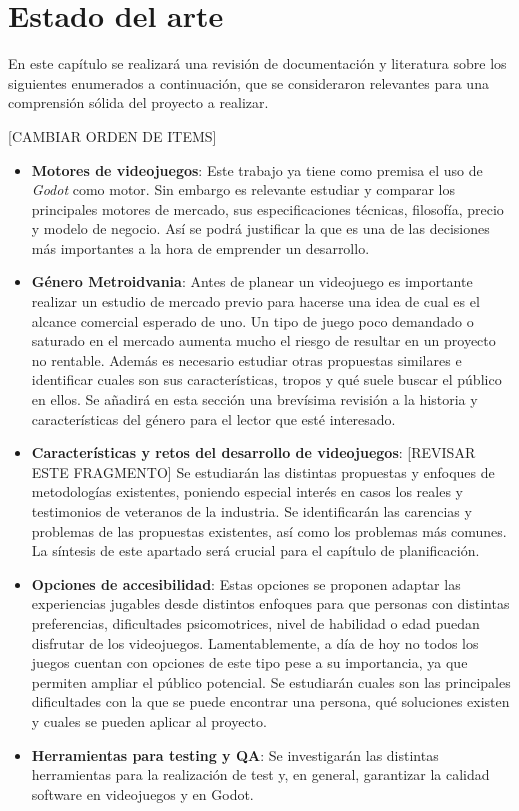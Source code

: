 \chapter{Estado del arte}

En este capítulo se realizará una revisión de documentación y literatura sobre los siguientes enumerados a continuación, que se consideraron relevantes para una comprensión sólida del proyecto a realizar.

[CAMBIAR ORDEN DE ITEMS]
\begin{itemize}
    \item \textbf{Motores de videojuegos}: Este trabajo ya tiene como premisa el uso de \textit{Godot} como motor. Sin embargo es relevante estudiar y comparar los principales motores de mercado, sus especificaciones técnicas, filosofía, precio y modelo de negocio. Así se podrá justificar la que es una de las decisiones más importantes a la hora de emprender un desarrollo.
    
    \item \textbf{Género Metroidvania}: Antes de planear un videojuego es importante realizar un estudio de mercado previo para hacerse una idea de cual es el alcance comercial esperado de uno. Un tipo de juego poco demandado o saturado en el mercado aumenta mucho el riesgo de resultar en un proyecto no rentable. Además es necesario estudiar otras propuestas similares e identificar cuales son sus características, tropos y qué suele buscar el público en ellos. Se añadirá en esta sección una brevísima revisión a la historia y características del género para el lector que esté interesado.
    
    \item \textbf{Características y retos del desarrollo de videojuegos}: [REVISAR ESTE FRAGMENTO] Se estudiarán las distintas propuestas y enfoques de metodologías existentes, poniendo especial interés en casos los reales y testimonios de veteranos de la industria. Se identificarán las carencias y problemas de las propuestas existentes, así como los problemas más comunes. La síntesis de este apartado será crucial para el capítulo de planificación.
    
    \item \textbf{Opciones de accesibilidad}: Estas opciones se proponen adaptar las experiencias jugables desde distintos enfoques para que personas con distintas preferencias, dificultades psicomotrices, nivel de habilidad o edad puedan disfrutar de los videojuegos. Lamentablemente, a día de hoy no todos los juegos cuentan con opciones de este tipo pese a su importancia, ya que permiten ampliar el público potencial. Se estudiarán cuales son las principales dificultades con la que se puede encontrar una persona, qué soluciones existen y cuales se pueden aplicar al proyecto.
    
    \item \textbf{Herramientas para testing y QA}: Se investigarán las distintas herramientas para la realización de test y, en general, garantizar la calidad software en videojuegos y en Godot.

\end{itemize} 

